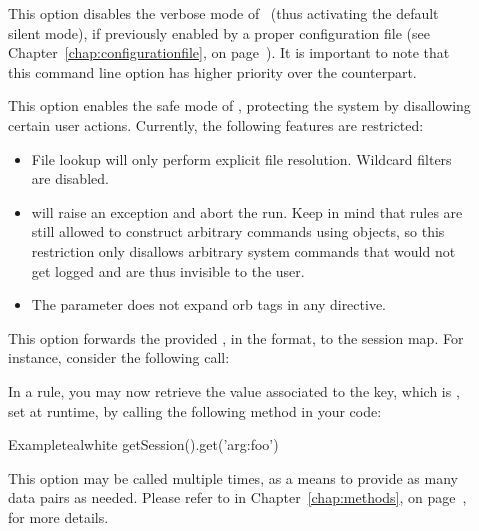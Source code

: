 \begin{description}
\item[] This option disables the verbose mode of \arara\ (thus activating the default silent mode), if previously enabled by a proper configuration file (see Chapter~\ref{chap:configurationfile}, on page~\pageref{chap:configurationfile}). It is important to note that this command line option has higher priority over the  counterpart.

\item[] This option enables the safe mode of \arara, protecting the system  by disallowing certain user actions. Currently, the following features are restricted:

\begin{itemize}[label={--}]
\item File lookup will only perform explicit file resolution. Wildcard filters are disabled.

\item {} will raise an exception and abort the run. Keep in mind that rules are still allowed to construct arbitrary commands using  objects, so this restriction only disallows arbitrary system commands that would not get logged and are thus invisible to the user.

\item The  parameter does not expand orb tags in any directive.
\end{itemize}

\item[] This option forwards the provided , in the  format, to the session map. For instance, consider the following call:


In a rule, you may now retrieve the value associated to the  key, which is , set at runtime, by calling the following method in your code:

\begin{codebox}{Example}{teal}{\icnote}{white}
getSession().get('arg:foo')
\end{codebox}

This option may be called multiple times, as a means to provide as many data pairs as needed. Please refer to  in Chapter~\ref{chap:methods}, on page~\pageref{chap:methods}, for more details.
\end{description}

